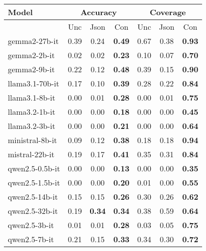 \begin{table}[t]
\centering
\begin{tabular}{l|ccc|ccc}
\hline
Model & \multicolumn{3}{c|}{Accuracy} & \multicolumn{3}{c}{Coverage}\\ \hline 
 & Unc & Json & Con & Unc & Json & Con \\
\hline
gemma2-27b-it & 0.39 & 0.24 & \textbf{0.49} & 0.67 & 0.38 & \textbf{0.93} \\ \hline
gemma2-2b-it & 0.02 & 0.02 & \textbf{0.23} & 0.10 & 0.07 & \textbf{0.70} \\ \hline
gemma2-9b-it & 0.22 & 0.12 & \textbf{0.48} & 0.39 & 0.15 & \textbf{0.90} \\ \hline
llama3.1-70b-it & 0.17 & 0.10 & \textbf{0.39} & 0.28 & 0.22 & \textbf{0.84} \\ \hline
llama3.1-8b-it & 0.00 & 0.01 & \textbf{0.28} & 0.00 & 0.01 & \textbf{0.75} \\ \hline
llama3.2-1b-it & 0.00 & 0.00 & \textbf{0.18} & 0.00 & 0.00 & \textbf{0.45} \\ \hline
llama3.2-3b-it & 0.00 & 0.00 & \textbf{0.21} & 0.00 & 0.00 & \textbf{0.64} \\ \hline
ministral-8b-it & 0.09 & 0.12 & \textbf{0.38} & 0.18 & 0.18 & \textbf{0.94} \\ \hline
mistral-22b-it & 0.19 & 0.17 & \textbf{0.41} & 0.35 & 0.31 & \textbf{0.84} \\ \hline
qwen2.5-0.5b-it & 0.00 & 0.00 & \textbf{0.13} & 0.00 & 0.00 & \textbf{0.35} \\ \hline
qwen2.5-1.5b-it & 0.00 & 0.00 & \textbf{0.20} & 0.01 & 0.00 & \textbf{0.55} \\ \hline
qwen2.5-14b-it & 0.15 & 0.15 & \textbf{0.26} & 0.30 & 0.26 & \textbf{0.62} \\ \hline
qwen2.5-32b-it & 0.19 & \textbf{0.34} & \textbf{0.34} & 0.38 & 0.59 & \textbf{0.64} \\ \hline
qwen2.5-3b-it & 0.01 & 0.01 & \textbf{0.28} & 0.03 & 0.05 & \textbf{0.75} \\ \hline
qwen2.5-7b-it & 0.21 & 0.15 & \textbf{0.33} & 0.34 & 0.30 & \textbf{0.72} \\ \hline
\end{tabular}

\end{table}
